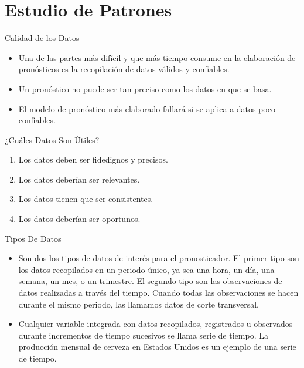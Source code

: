 
\section{Estudio de Patrones}
\label{sec:patterns}


\begin{frame}{Calidad de los Datos}

  \begin{itemize} \justifying \parskip3mm
  \item Una de las partes más difícil y que más tiempo consume en la elaboración de pronósticos es la recopilación de datos válidos y confiables.
  \item Un pronóstico no puede ser tan preciso como los datos en que se basa. 
  \item El modelo de pronóstico más elaborado fallará si se aplica a datos poco confiables.
  \end{itemize}
 
\end{frame}

\begin{frame}{¿Cuáles Datos Son Útiles?}
  
  \begin{enumerate} \justifying \parskip5mm
  \item Los datos deben ser fidedignos y precisos.
  \item Los datos deberían ser relevantes.
  \item Los datos tienen que ser consistentes.
  \item Los datos deberían ser oportunos.
  \end{enumerate}

\end{frame}

\begin{frame}{Tipos De Datos}

  \begin{itemize}\justifying
  \item   Son dos los tipos de datos de interés para el pronosticador. El primer tipo son los datos recopilados en un periodo único, ya sea una hora, un día, una semana, un mes, o un trimestre. El segundo tipo son las observaciones de datos realizadas a través del tiempo. Cuando todas las observaciones se hacen durante el mismo periodo, las llamamos \alert{datos de corte transversal}.
  \item   Cualquier variable integrada con datos recopilados, registrados u observados durante
incrementos de tiempo sucesivos se llama \alert{serie de tiempo}. La producción mensual de cerveza
en Estados Unidos es un ejemplo de una \alert{serie de tiempo}.
  \end{itemize}
\end{frame}

